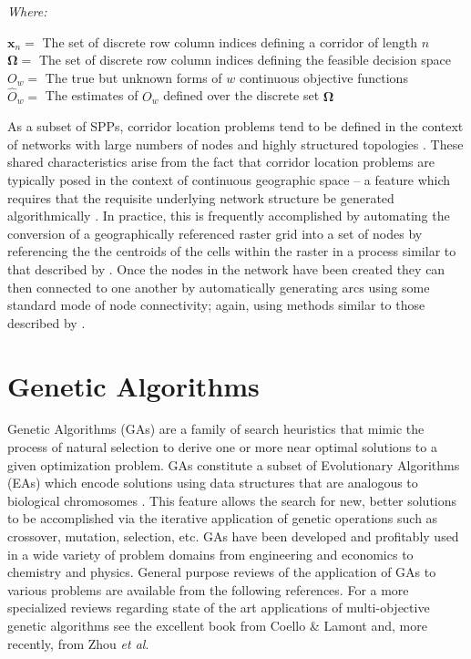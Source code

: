             \noindent \textit{Where:} \hfill
            
            \begin{center}
            $\textbf{x}_n =$ The set of discrete row column indices defining a corridor of length $n$
            \\
            $\boldsymbol{\Omega} =$ The set of discrete row column indices defining the feasible decision space
            \\
            $O_w =$ The true but unknown forms of $w$ continuous objective functions
            \\
            $\hat{O}_w =$ The estimates of $O_w$ defined over the discrete set $\boldsymbol{\Omega}$
            \end{center}
                        
As a subset of SPPs, corridor location problems tend to be defined in the context of networks with large numbers of nodes and highly structured topologies \cite{Goodchild1977}. These shared characteristics arise from the fact that corridor location problems are typically posed in the context of continuous geographic space – a feature which requires that the requisite underlying network structure be generated algorithmically \cite{Stefanakis1995}. In practice, this is frequently accomplished by automating the conversion of a geographically referenced raster grid into a set of nodes by referencing the the centroids of the cells within the raster in a process similar to that described by \cite{Huber1985}. Once the nodes in the network have been created they can then connected to one another by automatically generating arcs using some standard mode of node connectivity; again, using methods similar to those described by \cite{Church1992}.
            
\section{Genetic Algorithms}

Genetic Algorithms (GAs) are a family of search heuristics that mimic the process of natural selection to derive one or more near optimal solutions to a given optimization problem. \cite{Goldberg1989} GAs constitute a subset of Evolutionary Algorithms (EAs) which encode solutions using data structures that are analogous to biological chromosomes \cite{Deb2001}. This feature allows the search for new, better solutions to be accomplished via the iterative application of genetic operations such as crossover, mutation, selection, etc. \cite{Goldberg1988} GAs have been developed and profitably used in a wide variety of problem domains from engineering and economics to chemistry and physics. General purpose reviews of the application of GAs to various problems are available from the following references. \cite{Fonseca1995, Zitzler1998, Coello2001} For a more specialized reviews regarding state of the art applications of multi-objective genetic algorithms see the excellent book from Coello \& Lamont and, more recently, from Zhou \textit{et al}. \cite{Coello2007, Zhou2011}
            
